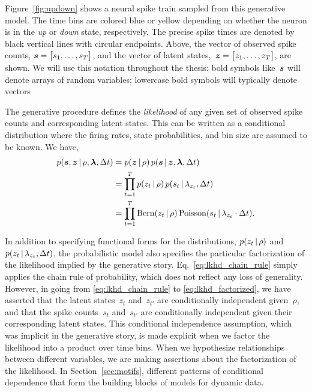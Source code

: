 Figure~\ref{fig:updown} shows a neural spike train sampled from this
generative model. The time bins are colored blue or yellow depending
on whether the neuron is in the \textit{up} or \textit{down} state,
respectively.  The precise spike times are denoted by black vertical
lines with circular endpoints. Above, the vector of observed spike
counts, ${\boldsymbol{s} = \big[s_1, \ldots, s_T \big]}$, and the vector of
latent states,~${\boldsymbol{z} = \big[z_1, \ldots, z_T \big]}$, are shown.  We
will use this notation throughout the thesis: bold symbols like~$\boldsymbol{s}$
will denote arrays of random variables; lowercase bold symbols will
typically denote vectors

The generative procedure defines the \emph{likelihood} of any given set of 
observed spike counts and corresponding latent states. This can be 
written as a conditional distribution where the firing rates,
state probabilities, and bin size are assumed to be known. We have,
\begin{align}
  \label{eq:lkhd_chain_rule}
  p(\boldsymbol{s}, \boldsymbol{z} \,|\, \rho, \boldsymbol{\lambda}, \Delta t) 
  &= p(\boldsymbol{z} \,|\, \rho) \, p(\boldsymbol{s} \,|\, \boldsymbol{z}, \boldsymbol{\lambda}, \Delta t) \\
  \label{eq:lkhd_factorized}
  &= \prod_{t=1}^T p(z_t \,|\, \rho) \, p(s_t \,|\, \lambda_{z_t}, \Delta t) \\
  &= \prod_{t=1}^T \mathrm{Bern}(z_t \,|\, \rho) \, \mathrm{Poisson}(s_t \,|\, \lambda_{z_t} \cdot \Delta t).
\end{align} 

In addition to specifying functional forms for the distributions,
${p(z_t \,|\, \rho)}$ and~${p(z_t \,|\, \lambda_{z_t}, \Delta t)}$,
the probabilistic model also specifies the particular factorization of
the likelihood implied by the generative story.
Eq.~\ref{eq:lkhd_chain_rule} simply applies the chain rule of
probability, which does not reflect any loss of generality. However,
in going from \eqref{eq:lkhd_chain_rule} to
\eqref{eq:lkhd_factorized}, we have asserted that the latent
states~$z_t$ and~$z_{t'}$ are conditionally independent given~$\rho$,
and that the spike counts~$s_{t}$ and~$s_{t'}$ are conditionally
independent given their corresponding latent states. This conditional
independence assumption, which was implicit in the generative story,
is made explicit when we factor the likelihood into a product
over time bins. When we hypothesize relationships between different variables,
we are making assertions about the factorization of the likelihood. 
In Section~\ref{sec:motifs}, different patterns of conditional dependence 
that form the building blocks of models for dynamic data.

